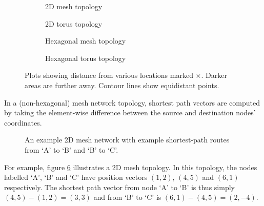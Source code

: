 		\begin{figure}
			\center
			
			\begin{subfigure}{\linewidth}
				\center
				\caption{2D mesh topology}
				\label{fig:distance-map-mesh}
			\end{subfigure}
			
			\vspace{1em}
			
			\begin{subfigure}{\linewidth}
				\center
				\caption{2D torus topology}
				\label{fig:distance-map-torus}
			\end{subfigure}
			
			\vspace{1em}
			
			\begin{subfigure}{\linewidth}
				\center
				\caption{Hexagonal mesh topology}
				\label{fig:distance-map-hex-mesh}
			\end{subfigure}
			
			\vspace{1em}
			
			\begin{subfigure}{\linewidth}
				\center
				\caption{Hexagonal torus topology}
				\label{fig:distance-map-hex-torus}
			\end{subfigure}
			
			\caption{Plots showing distance from various locations marked
			         {\color{red}$\times$}. Darker areas are further away. Contour
			         lines show equidistant points.}
			\label{fig:distance-map}
		\end{figure}
		
		In a (non-hexagonal) mesh network topology, shortest path vectors are
		computed by taking the element-wise difference between the source and
		destination nodes' coordinates.
		
		\begin{figure}
			\center
			\caption{An example 2D mesh network with example shortest-path routes
			from `A' to `B' and `B' to `C'.}
			\label{fig:mesh-topology-coordinates}
		\end{figure}
		
		For example, figure \ref{fig:mesh-topology-coordinates} illustrates a 2D
		mesh topology. In this topology, the nodes labelled `A', `B' and `C' have
		position vectors $(1, 2)$, $(4, 5)$ and $(6, 1)$ respectively. The
		shortest path vector from node `A' to `B' is thus simply $(4, 5) - (1, 2)
		= (3, 3)$ and from `B' to `C' is $(6, 1) - (4, 5) = (2, -4)$.
		
